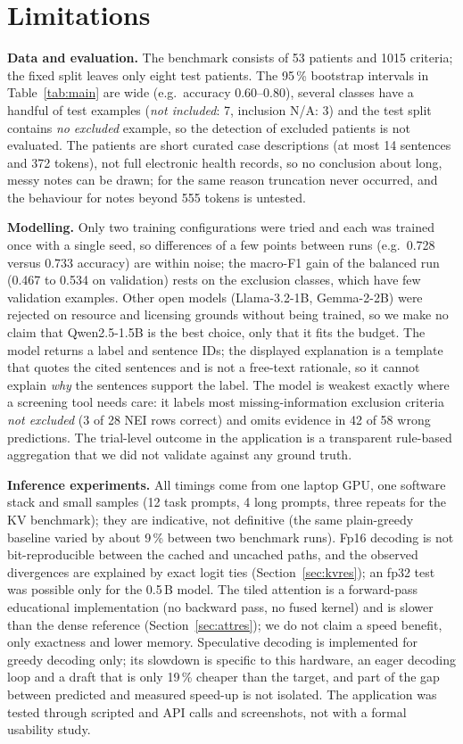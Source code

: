\section{Limitations}
\textbf{Data and evaluation.} The benchmark consists of 53 patients and 1015 criteria; the fixed split leaves only eight test patients. The 95\,\% bootstrap intervals in Table~\ref{tab:main} are wide (e.g.\ accuracy 0.60--0.80), several classes have a handful of test examples (\emph{not included}: 7, inclusion N/A: 3) and the test split contains \emph{no} \emph{excluded} example, so the detection of excluded patients is not evaluated. The patients are short curated case descriptions (at most 14 sentences and 372 tokens), not full electronic health records, so no conclusion about long, messy notes can be drawn; for the same reason truncation never occurred, and the behaviour for notes beyond 555 tokens is untested.

\textbf{Modelling.} Only two training configurations were tried and each was trained once with a single seed, so differences of a few points between runs (e.g.\ 0.728 versus 0.733 accuracy) are within noise; the macro-F1 gain of the balanced run (0.467 to 0.534 on validation) rests on the exclusion classes, which have few validation examples. Other open models (Llama-3.2-1B, Gemma-2-2B) were rejected on resource and licensing grounds without being trained, so we make no claim that Qwen2.5-1.5B is the best choice, only that it fits the budget. The model returns a label and sentence IDs; the displayed explanation is a template that quotes the cited sentences and is not a free-text rationale, so it cannot explain \emph{why} the sentences support the label. The model is weakest exactly where a screening tool needs care: it labels most missing-information exclusion criteria \emph{not excluded} (3 of 28 NEI rows correct) and omits evidence in 42 of 58 wrong predictions. The trial-level outcome in the application is a transparent rule-based aggregation that we did not validate against any ground truth.

\textbf{Inference experiments.} All timings come from one laptop GPU, one software stack and small samples (12 task prompts, 4 long prompts, three repeats for the KV benchmark); they are indicative, not definitive (the same plain-greedy baseline varied by about 9\,\% between two benchmark runs). Fp16 decoding is not bit-reproducible between the cached and uncached paths, and the observed divergences are explained by exact logit ties (Section~\ref{sec:kvres}); an fp32 test was possible only for the 0.5\,B model. The tiled attention is a forward-pass educational implementation (no backward pass, no fused kernel) and is slower than the dense reference (Section~\ref{sec:attres}); we do not claim a speed benefit, only exactness and lower memory. Speculative decoding is implemented for greedy decoding only; its slowdown is specific to this hardware, an eager decoding loop and a draft that is only 19\,\% cheaper than the target, and part of the gap between predicted and measured speed-up is not isolated. The application was tested through scripted and API calls and screenshots, not with a formal usability study.

